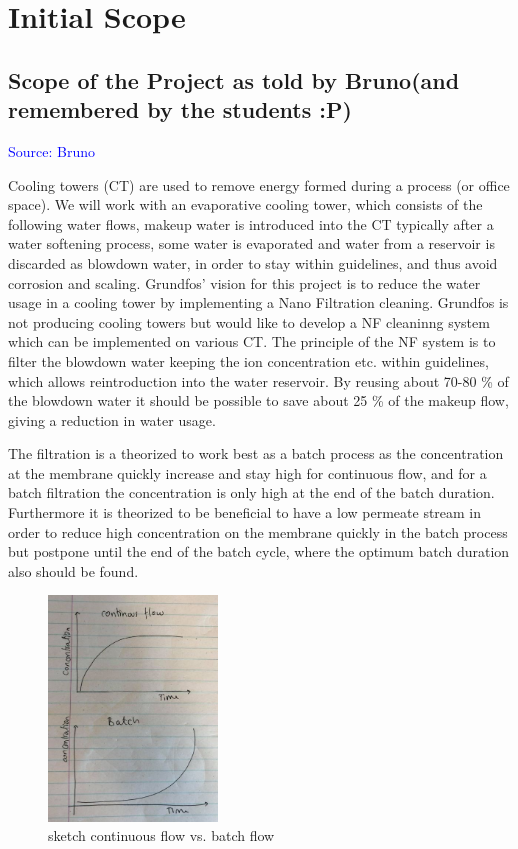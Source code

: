 \section{Initial Scope}


\subsection{Scope of the Project as told by Bruno(and remembered by the students :P)}
\textcolor{blue}{Source: Bruno}

Cooling towers (CT) are used to remove energy formed during a process (or office space). We will work with an evaporative cooling tower, which consists of the following water flows, makeup water is introduced into the CT typically after a water softening process, some water is evaporated and water from a reservoir is discarded as blowdown water, in order to stay within guidelines, and thus avoid corrosion and scaling. 
Grundfos' vision for this project is to reduce the water usage in a cooling tower by implementing a Nano Filtration cleaning.
Grundfos is not producing cooling towers but would like to develop a NF cleaninng system which can be implemented on various CT. The principle of the NF system is to filter the blowdown water keeping the ion concentration etc. within guidelines, which allows reintroduction into the water reservoir. By reusing about 70-80 \% of the blowdown water it should be possible to save about 25 \% of the makeup flow, giving a reduction in water usage.  

The filtration is a theorized to work best as a batch process as the concentration at the membrane quickly increase and stay high for continuous flow, and for a batch filtration the concentration is only high at the end of the batch duration. 
Furthermore it is theorized to be beneficial to have a low permeate stream in order to reduce high concentration on the membrane quickly in the batch process but postpone until the end of the batch cycle, where the optimum batch duration also should be found. 


\begin{figure}[htbp] %
	\centering
	\includegraphics[width=0.4\textwidth]{Billeder/intro/continous_vs_batchflow.jpg}
	\caption{ sketch continuous flow vs. batch flow }
	\label{fig:continous_vs_batchflow}
\end{figure}

